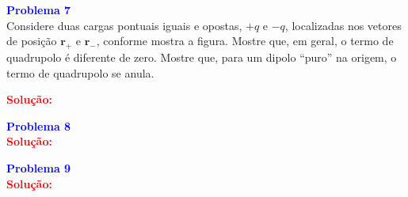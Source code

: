 \documentclass[a4paper,12pt]{article}
\newcommand{\printingbibliography}{%

    \pagestyle{myheadings}
    \markright{}
    \sloppy
    \printbibliography[heading=bibintoc, %
                   title=Refer\^encias %
                  ]
    \fussy%
}
\begin{document}
\begin{flushleft}
\textbf{\textcolor{blue}{\Large Problema 7}}\\

Considere duas cargas pontuais iguais e opostas, \( +q \) e \( -q \), localizadas nos vetores 
de posição \( \mathbf{r}_+ \) e \( \mathbf{r}_- \), conforme mostra a figura. Mostre que, em geral, 
o termo de quadrupolo é diferente de zero. Mostre que, para um dipolo “puro” na origem, o termo de 
quadrupolo se anula.

\begin{center}
\end{center}

\textcolor{red}{\textbf{Solução:}}\\

\end{flushleft}

\begin{flushleft}
\textbf{\textcolor{blue}{\Large Problema 8}}\\

\textcolor{red}{\textbf{Solução:}}\\

\end{flushleft}

\begin{flushleft}
\textbf{\textcolor{blue}{\Large Problema 9}}\\

\textcolor{red}{\textbf{Solução:}}\\

\end{flushleft}

\end{document}

